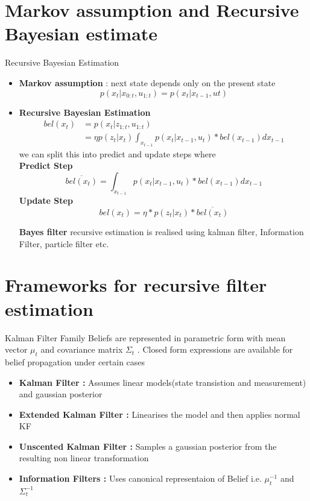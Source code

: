 \documentclass{beamer}
\begin{document}
\section{Markov assumption and Recursive Bayesian estimate}
\begin{frame}{Recursive Bayesian Estimation}
    \begin{itemize} 
        \item \textbf{Markov assumption} : next state depends only on the present state
            $$p(x_{t}|x_{0:t},u_{1:t}) = p(x_t | x_{t-1},u{t})$$
        \item \textbf{Recursive Bayesian Estimation}
\begin{align*}  
    bel(x_t) & = p(x_t | z_{1:t},u_{1:t})\\
    & = \eta p(z_t|x_t) \int_{x_{t-1}} p(x_t |x_{t-1},u_t) * bel(x_{t-1})dx_{t-1}
 \end{align*}
 we can split this into predict and update steps where\\
 \textbf{Predict Step} 
 $$\overline{bel(x_t)} =  \int_{x_{t-1}} p(x_t |x_{t-1},u_t) * bel(x_{t-1})dx_{t-1}$$
 \textbf{Update Step} 
 $$bel(x_t) =  \eta * p(z_t | x_t) * \overline{bel(x_t)}$$


 \textbf{Bayes filter} recursive estimation is realised using kalman filter, Information Filter, particle filter etc.
    \end{itemize}
\end{frame}

\section{Frameworks for recursive filter estimation}
\begin{frame}{Kalman Filter Family}
    Beliefs are represented in parametric form 
    with mean vector $\mu_t$ and covariance matrix $\Sigma _t$ . Closed form expressions are available for belief propagation under certain cases

    \begin{itemize}        
        \item \textbf{Kalman Filter :} Assumes linear models(state transistion and measurement) and gaussian posterior
        \item \textbf{Extended Kalman Filter :} Linearises the model and then applies normal KF
        \item \textbf{Unscented Kalman Filter :} Samples a gaussian posterior from the resulting non linear transformation
        \item \textbf{Information Filters :} Uses canonical representaion of Belief i.e. $\mu_{t}^{-1}$ and $\Sigma_{t}^{-1}$
    \end{itemize}
\end{frame}
\end{document}
